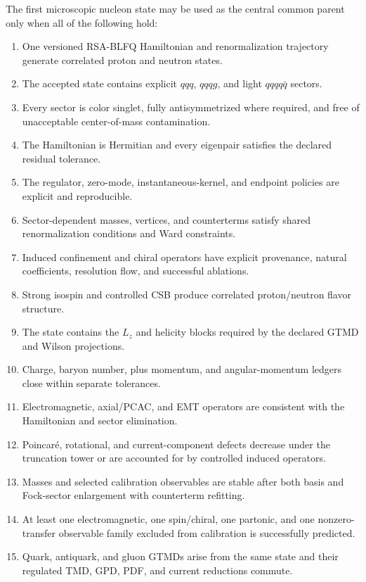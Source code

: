 \documentclass[11pt]{article}
\newcommand{\Lz}{L_z}
\begin{document}
The first microscopic nucleon state may be used as the central common parent
only when all of the following hold:
\begin{enumerate}
 \item One versioned RSA-BLFQ Hamiltonian and renormalization trajectory
 generate correlated proton and neutron states.
 \item The accepted state contains explicit \(qqq\), \(qqqg\), and light
 \(qqqq\bar q\) sectors.
 \item Every sector is color singlet, fully antisymmetrized where required, and
 free of unacceptable center-of-mass contamination.
 \item The Hamiltonian is Hermitian and every eigenpair satisfies the declared
 residual tolerance.
 \item The regulator, zero-mode, instantaneous-kernel, and endpoint policies are
 explicit and reproducible.
 \item Sector-dependent masses, vertices, and counterterms satisfy shared
 renormalization conditions and Ward constraints.
 \item Induced confinement and chiral operators have explicit provenance,
 natural coefficients, resolution flow, and successful ablations.
 \item Strong isospin and controlled CSB produce correlated proton/neutron
 flavor structure.
 \item The state contains the \(\Lz\) and helicity blocks required by the
 declared GTMD and Wilson projections.
 \item Charge, baryon number, plus momentum, and angular-momentum ledgers close
 within separate tolerances.
 \item Electromagnetic, axial/PCAC, and EMT operators are consistent with the
 Hamiltonian and sector elimination.
 \item Poincar\'e, rotational, and current-component defects decrease under the
 truncation tower or are accounted for by controlled induced operators.
 \item Masses and selected calibration observables are stable after both basis
 and Fock-sector enlargement with counterterm refitting.
 \item At least one electromagnetic, one spin/chiral, one partonic, and one
 nonzero-transfer observable family excluded from calibration is successfully
 predicted.
 \item Quark, antiquark, and gluon GTMDs arise from the same state and their
 regulated TMD, GPD, PDF, and current reductions commute.

\end{enumerate}
\end{document}
